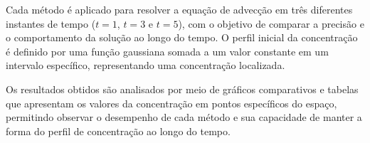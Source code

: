 Cada método é aplicado para resolver a equação de advecção em três diferentes instantes de tempo ($t=1$, $t=3$ e $t=5$), com o objetivo de comparar a precisão e o comportamento da solução ao longo do tempo. O perfil inicial da concentração é definido por uma função gaussiana somada a um valor constante em um intervalo específico, representando uma concentração localizada.

Os resultados obtidos são analisados por meio de gráficos comparativos e tabelas que apresentam os valores da concentração em pontos específicos do espaço, permitindo observar o desempenho de cada método e sua capacidade de manter a forma do perfil de concentração ao longo do tempo.
